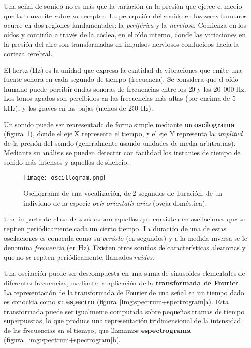 Una señal de sonido no es más que la variación en la presión que ejerce el medio que la transmite sobre su receptor.
La percepción del sonido en los seres humanos ocurre en dos regiones fundamentales: la \textit{periférica} y la \textit{nerviosa}.
Comienza en los oídos y continúa a través de la cóclea, en el oído interno, donde las variaciones en la presión del aire son transformadas en impulsos nerviosos conducidos hacia la corteza cerebral.

El hertz (Hz) es la unidad que expresa la cantidad de vibraciones que emite una fuente sonora en cada segundo de tiempo (frecuencia).
Se considera que el oído humano puede percibir ondas sonoras de frecuencias entre los 20 y los 20~000 Hz.
Los tonos agudos son percibidos en las frecuencias más altas (por encima de 5 kHz), y los graves en las bajas (menos de 250 Hz).

Un sonido puede ser representado de forma simple mediante un \textbf{oscilograma} (figura~\ref{img:oscillogram}), donde el eje X representa el tiempo, y el eje Y representa la \textit{amplitud} de la presión del sonido (generalmente usando unidades de media arbitrarias).
Mediante su análisis se pueden detectar con facilidad los instantes de tiempo de sonido más intensos y aquellos de silencio.

\begin{figure}[!h]
    \centering
    \texttt{[image: oscillogram.png]}
    \caption{Oscilograma de una vocalización, de 2 segundos de duración, de un individuo de la especie \textit{ovis orientalis aries} (oveja doméstica).}
    \label{img:oscillogram}
\end{figure}

Una importante clase de sonidos son aquellos que consisten en oscilaciones que se repiten periódicamente cada un cierto tiempo.
La duración de una de estas oscilaciones es conocida como su \textit{período} (en segundos) y a la medida inversa se le denomina \textit{frecuencia} (en Hz).
Existen otros sonidos de características aleatorias y que no se repiten periódicamente, llamados \textit{ruidos}.

Una oscilación puede ser descompuesta en una suma de sinusoides elementales de diferentes frecuencias, mediante la aplicación de la \textbf{transformada de Fourier}.
La representación de la transformada de Fourier de una señal en un tiempo dado es conocida como su \textbf{espectro} (figura~\ref{img:spectrum+spectrogram}a).
Esta transformada puede ser igualmente computada sobre pequeñas tramas de tiempo superpuestas, lo que produce una representación tridimensional de la intensidad de las frecuencias en el tiempo, que llamamos \textbf{espectrograma} (figura~\ref{img:spectrum+spectrogram}b).

